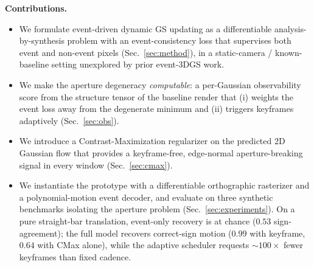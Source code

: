 \medskip\noindent\textbf{Contributions.}
\begin{itemize}[leftmargin=*,topsep=2pt,itemsep=1pt]
  \item We formulate event-driven dynamic GS updating as a differentiable analysis-by-synthesis problem with an event-consistency loss that supervises both event and non-event pixels (Sec.~\ref{sec:method}), in a static-camera / known-baseline setting unexplored by prior event-3DGS work.
  \item We make the aperture degeneracy \emph{computable}: a per-Gaussian observability score from the structure tensor of the baseline render that (i) weights the event loss away from the degenerate minimum and (ii) triggers keyframes adaptively (Sec.~\ref{sec:obs}).
  \item We introduce a Contrast-Maximization regularizer on the predicted 2D Gaussian flow that provides a keyframe-free, edge-normal aperture-breaking signal in every window (Sec.~\ref{sec:cmax}).
  \item We instantiate the prototype with a differentiable orthographic rasterizer and a polynomial-motion event decoder, and evaluate on three synthetic benchmarks isolating the aperture problem (Sec.~\ref{sec:experiments}). On a pure straight-bar translation, event-only recovery is at chance ($0.53$ sign-agreement); the full model recovers correct-sign motion ($0.99$ with keyframe, $0.64$ with CMax alone), while the adaptive scheduler requests $\sim$$100\times$ fewer keyframes than fixed cadence.
\end{itemize}
